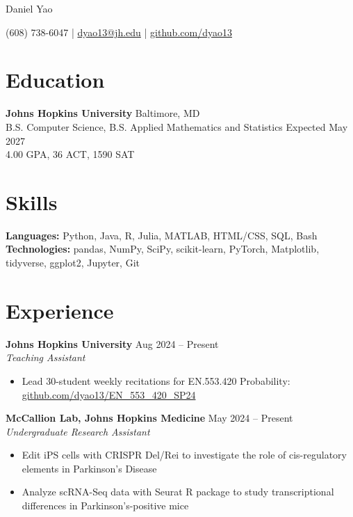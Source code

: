 \documentclass[11pt]{article}       %
\begin{document}
\centerline{\Huge Daniel Yao}

\vspace{5pt}

\centerline{(608) 738-6047 | \href{mailto:dyao13@jh.edu}{dyao13@jh.edu} | \href{https://github.com/dyao13/}{github.com/dyao13}}

\vspace{-9pt}

\section*{Education}
\textbf{Johns Hopkins University} \hfill Baltimore, MD \\
B.S. Computer Science, B.S. Applied Mathematics and Statistics \hfill Expected May 2027 \\
4.00 GPA, 36 ACT, 1590 SAT \\

\vspace{-9pt}

\section*{Skills}
\textbf{Languages:} Python, Java, R, Julia, MATLAB, HTML/CSS, SQL, Bash \\
\textbf{Technologies:} pandas, NumPy, SciPy, scikit-learn, PyTorch, Matplotlib, tidyverse, ggplot2, Jupyter, Git

\vspace{-9pt}

\section*{Experience}
\textbf{Johns Hopkins University} \hfill Aug 2024 – Present \\
\textit{Teaching Assistant} \vspace{-9pt} \\
\begin{itemize}
  \item Lead 30-student weekly recitations for EN.553.420 Probability: \href{https://github.com/dyao13/EN_553_420_SP24}{github.com/dyao13/EN\_553\_420\_SP24}
\end{itemize}

\textbf{McCallion Lab, Johns Hopkins Medicine} \hfill May 2024 – Present \\
\textit{Undergraduate Research Assistant} \vspace{-9pt} \\
\begin{itemize}
  \item Edit iPS cells with CRISPR Del/Rei to investigate the role of cis-regulatory elements in Parkinson’s Disease
  \item Analyze scRNA-Seq data with Seurat R package to study transcriptional differences in Parkinson’s-positive mice
\end{itemize}
\end{document}

